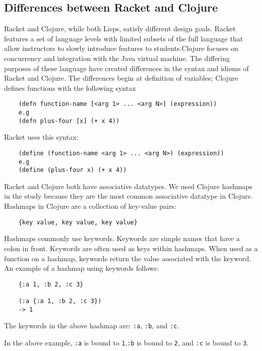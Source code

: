 \documentclass[12pt]{article}
\begin{document}
	\subsection{Differences between Racket and Clojure}\label{sec:diff}
	
Racket and Clojure, while both Lisps, satisfy different design goals. 
Racket features a set of language levels with limited subsets of the full language that allow instructors to slowly introduce features to students.Clojure focuses on concurrency and integration with the Java virtual machine. 
The differing purposes of these language have created differences in the syntax and idioms of Racket and Clojure.
 The differences begin at definition of variables; Clojure defines functions with the following syntax

\begin{verbatim}
	(defn function-name [<arg 1> ... <arg N>] (expression))
	e.g
	(defn plus-four [x] (+ x 4))
\end{verbatim}
Racket uses this syntax:
\begin{verbatim}
	(define (function-name <arg 1> ... <arg N>) (expression))
	e.g
	(define (plus-four x) (+ x 4))
\end{verbatim}

Racket and Clojure both have associative datatypes.%
We used Clojure hashmaps in the study because they are the most common associative datatype in Clojure.
Hashmaps in Clojure are a collection of key-value pairs: 

\begin{verbatim}
	{key value, key value, key value}
\end{verbatim}

Hashmaps commonly use keywords. Keywords are simple names that have a colon in front. Keywords are often used as keys within hashmaps. 
When used as a function on a hashmap, keywords return the value associated with the keyword. 
An example of a hashmap using keywords follows: 

\begin{verbatim}
	{:a 1, :b 2, :c 3}
	
	(:a {:a 1, :b 2, :c 3})
	-> 1
\end{verbatim}

The keywords in the above hashmap are: \texttt{:a}, \texttt{:b}, and \texttt{:c}.

In the above example, \texttt{:a} is bound to \texttt{1},\texttt{:b} is bound to \texttt{2}, and \texttt{:c} is bound to \texttt{3}.
\end{document}
